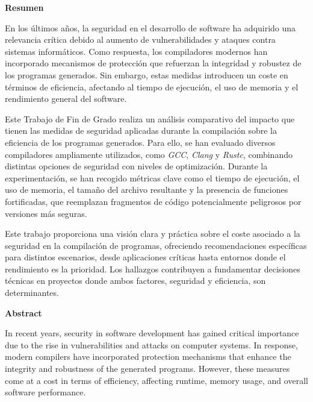 \vspace*{2cm}
\begin{center}
{\Large \bfseries Resumen}

\vspace{2.5cm}
\end{center}

En los últimos años, la seguridad en el desarrollo de software ha
adquirido una relevancia crítica debido al aumento de vulnerabilidades y
ataques contra sistemas informáticos. Como respuesta, los compiladores
modernos han incorporado mecanismos de protección que refuerzan la
integridad y robustez de los programas generados. Sin embargo, estas
medidas introducen un coste en términos de eficiencia, afectando al
tiempo de ejecución, el uso de memoria y el rendimiento general del
software.

Este Trabajo de Fin de Grado realiza un análisis comparativo del impacto
que tienen las medidas de seguridad aplicadas durante la compilación
sobre la eficiencia de los programas generados. Para ello, se han
evaluado diversos compiladores ampliamente utilizados, como \emph{GCC}, 
\emph{Clang} y \emph{Rustc}, combinando distintas opciones de seguridad con
niveles de optimización. Durante la experimentación, se han recogido métricas
clave como el tiempo de ejecución, el uso de memoria, el tamaño del archivo resultante
y la presencia de funciones fortificadas, que reemplazan fragmentos de
código potencialmente peligrosos por versiones más seguras.

Este trabajo proporciona una visión clara y práctica sobre el coste
asociado a la seguridad en la compilación de programas, ofreciendo
recomendaciones específicas para distintos escenarios, desde
aplicaciones críticas hasta entornos donde el rendimiento es la
prioridad. Los hallazgos contribuyen a fundamentar decisiones técnicas
en proyectos donde ambos factores, seguridad y eficiencia, son
determinantes.

\clearpage

\vspace*{2cm}
\begin{center}
{\Large \bfseries Abstract}

\vspace{2.5cm}
\end{center}

In recent years, security in software development has gained critical
importance due to the rise in vulnerabilities and attacks on computer
systems. In response, modern compilers have incorporated protection
mechanisms that enhance the integrity and robustness of the generated
programs. However, these measures come at a cost in terms of efficiency,
affecting runtime, memory usage, and overall software performance.

